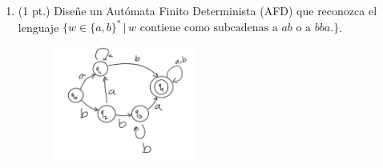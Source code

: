 \documentclass[letterpaper,12pt]{article}
\begin{document}
\begin{enumerate}
\begin{enumerate}
\item (1 pt.) Diseñe un Autómata Finito Determinista (AFD) que reconozca el lenguaje \linebreak $\{w\in \{a,b\}^* \, |\, w \text{ contiene como subcadenas a $ab$ o a $bba$.}\}$.
    \begin{figure}[ht]
    \includegraphics[width=0.45\textwidth]{Graphics/6n2}
  \end{figure}
  
\end{enumerate}

\end{enumerate}
\end{document}
